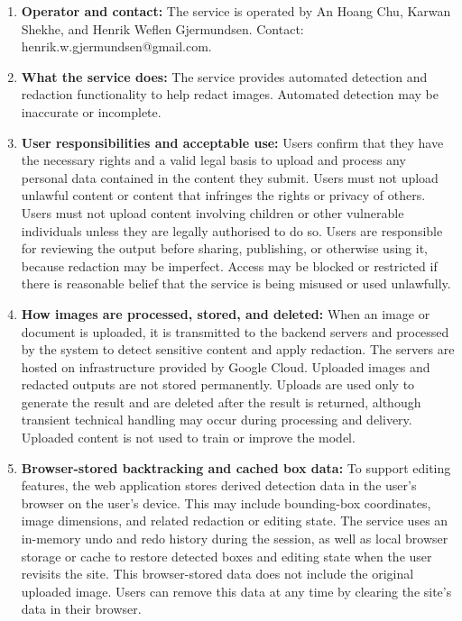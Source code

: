 \begin{enumerate}
    \item \textbf{Operator and contact:} The service is operated by An Hoang Chu, Karwan Shekhe, and Henrik Weflen Gjermundsen. Contact: henrik.w.gjermundsen@gmail.com.

    \item \textbf{What the service does:} The service provides automated detection and redaction functionality to help redact images. Automated detection may be inaccurate or incomplete.

    \item \textbf{User responsibilities and acceptable use:} Users confirm that they have the necessary rights and a valid legal basis to upload and process any personal data contained in the content they submit. Users must not upload unlawful content or content that infringes the rights or privacy of others. Users must not upload content involving children or other vulnerable individuals unless they are legally authorised to do so. Users are responsible for reviewing the output before sharing, publishing, or otherwise using it, because redaction may be imperfect. Access may be blocked or restricted if there is reasonable belief that the service is being misused or used unlawfully.

    \item \textbf{How images are processed, stored, and deleted:} When an image or document is uploaded, it is transmitted to the backend servers and processed by the system to detect sensitive content and apply redaction. The servers are hosted on infrastructure provided by Google Cloud. Uploaded images and redacted outputs are not stored permanently. Uploads are used only to generate the result and are deleted after the result is returned, although transient technical handling may occur during processing and delivery. Uploaded content is not used to train or improve the model.

    \item \textbf{Browser-stored backtracking and cached box data:} To support editing features, the web application stores derived detection data in the user's browser on the user's device. This may include bounding-box coordinates, image dimensions, and related redaction or editing state. The service uses an in-memory undo and redo history during the session, as well as local browser storage or cache to restore detected boxes and editing state when the user revisits the site. This browser-stored data does not include the original uploaded image. Users can remove this data at any time by clearing the site's data in their browser.


\end{enumerate}
